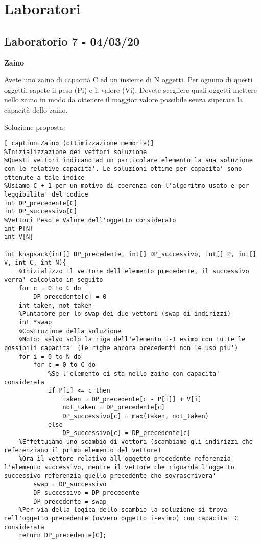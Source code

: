 \documentclass[../cheatSheetAlgoritmi.tex]{subfiles}
\begin{document}
\section{Laboratori}
\subsection{Laboratorio 7 - 04/03/20}
\textbf{Zaino}

Avete uno zaino di capacità C ed un insieme di N oggetti. Per ognuno di questi oggetti, sapete il peso (Pi) e il valore (Vi). Dovete scegliere quali oggetti mettere nello zaino in modo da ottenere il maggior valore possibile senza superare la capacità dello zaino.

\bigskip

Soluzione proposta:
\begin{lstlisting}[ caption=Zaino (ottimizzazione memoria)]
%Inizializzazione dei vettori soluzione
%Questi vettori indicano ad un particolare elemento la sua soluzione con le relative capacita'. Le soluzioni ottime per capacita' sono ottenute a tale indice
%Usiamo C + 1 per un motivo di coerenza con l'algoritmo usato e per leggibilita' del codice
int DP_precedente[C]
int DP_successivo[C]
%Vettori Peso e Valore dell'oggetto considerato
int P[N]
int V[N]

int knapsack(int[] DP_precedente, int[] DP_successivo, int[] P, int[] V, int C, int N){
	%Inizializzo il vettore dell'elemento precedente, il successivo verra' calcolato in seguito
	for c = 0 to C do
		DP_precedente[c] = 0
	int taken, not_taken
	%Puntatore per lo swap dei due vettori (swap di indirizzi)
	int *swap
	%Costruzione della soluzione
	%Noto: salvo solo la riga dell'elemento i-1 esimo con tutte le possibili capacita' (le righe ancora precedenti non le uso piu')
	for i = 0 to N do
		for c = 0 to C do
			%Se l'elemento ci sta nello zaino con capacita' considerata
			if P[i] <= c then
				taken = DP_precedente[c - P[i]] + V[i]
				not_taken = DP_precedente[c]
				DP_successivo[c] = max(taken, not_taken)
			else
				DP_successivo[c] = DP_precedente[c]		
	%Effettuiamo uno scambio di vettori (scambiamo gli indirizzi che referenziano il primo elemento del vettore)
	%Ora il vettore relativo all'oggetto precedente referenzia l'elemento successivo, mentre il vettore che riguarda l'oggetto successivo referenzia quello precedente che sovrascrivera'
		swap = DP_successivo
		DP_successivo = DP_precedente
		DP_precedente = swap	
	%Per via della logica dello scambio la soluzione si trova nell'oggetto precedente (ovvero oggetto i-esimo) con capacita' C considerata
	return DP_precedente[C];
	
\end{lstlisting}
\end{document}
